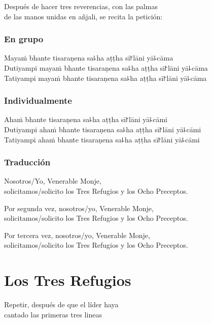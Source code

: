 \begin{instruction}
  Después de hacer tres reverencias, con las palmas\\
  de las manos unidas en añjali, se recita la petición:
\end{instruction}

\subsection{En grupo}

Mayaṁ bhante tisaraṇena sa꜕ha aṭṭha sī꜓lāni yā꜕cāma\\
Dutiyampi mayaṁ bhante tisaraṇena sa꜕ha aṭṭha sī꜓lāni yā꜕cāma\\
Tatiyampi mayaṁ bhante tisaraṇena sa꜕ha aṭṭha sī꜓lāni yā꜕cāma

\subsection{Individualmente}

Ahaṁ bhante tisaraṇena sa꜕ha aṭṭha sī꜓lāni yā꜕cāmi\\
Dutiyampi ahaṁ bhante tisaraṇena sa꜕ha aṭṭha sī꜓lāni yā꜕cāmi\\
Tatiyampi ahaṁ bhante tisaraṇena sa꜕ha aṭṭha sī꜓lāni yā꜕cāmi

\subsection{Traducción}

\begin{english}
  Nosotros/Yo, Venerable Monje,\\
  \vin solicitamos/solicito los Tres Refugios y los Ocho Preceptos.

  Por segunda vez, nosotros/yo, Venerable Monje,\\
  \vin solicitamos/solicito los Tres Refugios y los Ocho Preceptos.

  Por tercera vez, nosotros/yo, Venerable Monje,\\
  \vin solicitamos/solicito los Tres Refugios y los Ocho Preceptos.
\end{english}

\clearpage
\chapter{Los Tres Refugios}

\begin{instruction}
  Repetir, después de que el líder haya\\
  cantado las primeras tres lineas
\end{instruction}

